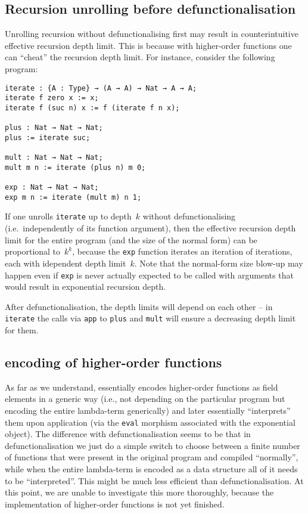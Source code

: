 \documentclass[final]{msc}
\begin{document}
\subsection{Recursion unrolling before defunctionalisation}

Unrolling recursion without defunctionalising first may result in
counterintuitive effective recursion depth limit. This is because with
higher-order functions one can ``cheat'' the recursion depth
limit. For instance, consider the following \Juvix{} program:
\begin{verbatim}
iterate : {A : Type} → (A → A) → Nat → A → A;
iterate f zero x := x;
iterate f (suc n) x := f (iterate f n x);

plus : Nat → Nat → Nat;
plus := iterate suc;

mult : Nat → Nat → Nat;
mult m n := iterate (plus n) m 0;

exp : Nat → Nat → Nat;
exp m n := iterate (mult m) n 1;
\end{verbatim}
If one unrolls \texttt{iterate} up to depth~$k$ without
defunctionalising (i.e.~independently of its function argument), then
the effective recursion depth limit for the entire program (and the
size of the normal form) can be proportional to~$k^k$, because the
\texttt{exp} function iterates an iteration of iterations, each with
idependent depth limit~$k$. Note that the normal-form size blow-up may
happen even if \texttt{exp} is never actually expected to be called
with arguments that would result in exponential recursion depth.

After defunctionalisation, the depth limits will depend on each other --
in \texttt{iterate} the calls via \texttt{app} to \texttt{plus} and
\texttt{mult} will ensure a decreasing depth limit for them.

\subsection{\Geb{} encoding of higher-order functions}

As far as we understand, \Geb{} essentially encodes higher-order functions
as field elements in a generic way (i.e., not depending on the
particular program but encoding the entire lambda-term generically)
and later essentially ``interprets'' them upon application (via the
\texttt{eval} morphism associated with the exponential object). The
difference with defunctionalisation seems to be that in
defunctionalisation we just do a simple switch to choose between a
finite number of functions that were present in the original program
and compiled ``normally'', while when the entire lambda-term is
encoded as a data structure all of it needs to be
``interpreted''. This might be much less
efficient than defunctionalisation. At this point, we are
unable to investigate this more thoroughly, because the \Geb{} implementation of higher-order functions is not yet finished.
\end{document}
